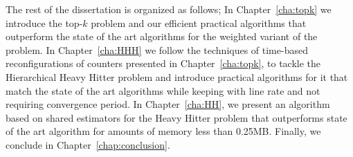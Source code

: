 The rest of the dissertation is organized as follows; In Chapter~\ref{cha:topk} we introduce the top-$k$ problem and our efficient practical algorithms that outperform the state of the art algorithms for the weighted variant of the problem. In Chapter~\ref{cha:HHH} we follow the techniques of time-based reconfigurations of counters presented in Chapter~\ref{cha:topk}, to tackle the Hierarchical Heavy Hitter problem and introduce practical algorithms for it that match the state of the art algorithms while keeping with line rate and not requiring convergence period. In Chapter~\ref{cha:HH}, we present an algorithm based on shared estimators for the Heavy Hitter problem that outperforms state of the art algorithm for amounts of memory less than 0.25MB. Finally, we conclude in Chapter~\ref{chap:conclusion}.

